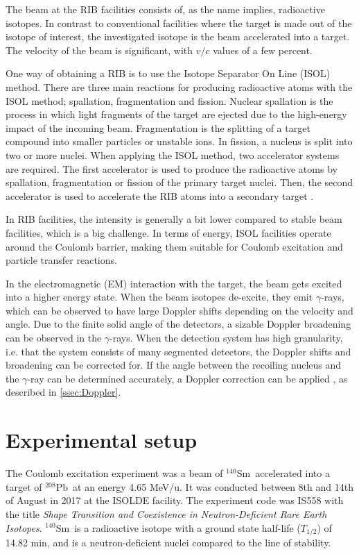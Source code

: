 \documentclass[twoside,english]{uiofysmaster/uiofysmaster}
\newcommand{\Sm}{$^{140}$Sm} %
\newcommand{\Pb}{$^{208}$Pb}
\newcommand{\ga}{$\gamma$}
\let\orgautoref\autoref
\renewcommand{\autoref}
        {%
		 \def\sectionautorefname{Section}%
		 \def\subsectionautorefname{Section}%
		 \def\subsubsectionautorefname{Section}%
		 \def\chapterautorefname{Chapter}%
          \orgautoref}
\begin{document}
The beam at the RIB facilities consists of, as the name implies, radioactive isotopes. 
In contrast to conventional facilities where the target is made out of the isotope of interest, the investigated isotope is the beam accelerated into a target.
The velocity of the beam is significant, with $v/c$ values of a few percent. 

One way of obtaining a RIB is to use the Isotope Separator On Line (ISOL) method. 
There are three main reactions for producing radioactive atoms with the ISOL method; spallation, fragmentation and fission. 
Nuclear spallation is the process in which light fragments of the target are ejected due to the high-energy impact of the incoming beam. 
Fragmentation is the splitting of a target compound into smaller particles or unstable ions. 
In fission, a nucleus is split into two or more nuclei.
When applying the ISOL method, two accelerator systems are required. 
The first accelerator is used to produce the radioactive atoms by spallation, fragmentation or fission of the primary target nuclei. 
Then, the second accelerator is used to accelerate the RIB atoms into a secondary target \cite{ISOLDE-web, Lindroos, ISOL}. 

In RIB facilities, the intensity is generally a bit lower compared to stable beam facilities, which is a big challenge. 
In terms of energy, ISOL facilities operate around the Coulomb barrier, making them suitable for Coulomb excitation and particle transfer reactions. 

In the electromagnetic (EM) interaction with the target, the beam gets excited into a higher energy state.
When the beam isotopes de-excite, they emit \ga-rays, which can be observed to have large Doppler shifts depending on the velocity and angle.
Due to the finite solid angle of the detectors, a sizable Doppler broadening can be observed in the \ga-rays. 
When the detection system has high granularity, i.e. that the system consists of many segmented detectors, the Doppler shifts and broadening can be corrected for. 
If the angle between the recoiling nucleus and the \ga-ray can be determined accurately, a Doppler correction can be applied \cite{MB-spect}, as described in \autoref{ssec:Doppler}.


\section{Experimental setup}\label{sec:exp_setup}

The Coulomb excitation experiment was a beam of \Sm\ accelerated into a target of \Pb\ at  an energy 4.65 MeV/u.
It was conducted between 8th and 14th of August in 2017 at the ISOLDE facility.
The experiment code was IS558 with the title \textit{Shape Transition and Coexistence in Neutron-Deficient Rare Earth Isotopes}.
\Sm\ is a radioactive isotope with a ground state half-life ($T_{1/2}$) of 14.82 min, and is a neutron-deficient nuclei compared to the line of stability.
\end{document}
